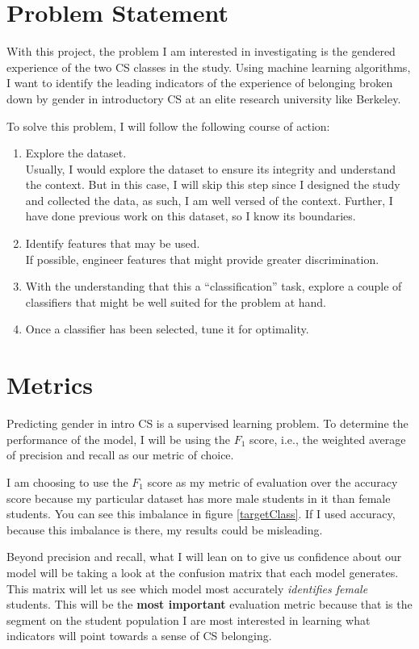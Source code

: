 \section*{Problem Statement}

With this project, the problem I am interested in investigating is the gendered experience of the two CS classes in the study. Using machine learning algorithms, I want to identify the leading indicators of the experience of belonging broken down by gender in introductory CS at an elite research university like Berkeley.

To solve this problem, I will follow the following course of action:
\begin{enumerate}%
\item Explore the dataset.\\
Usually, I would explore the dataset to ensure its integrity and understand the context. But in this case, I will skip this step since I designed the study and collected the data, as such, I am well versed of the context. Further, I have done previous work on this dataset, so I know its boundaries.
\item Identify features that may be used.\\ 
If possible, engineer features that might provide greater discrimination.
\item With the understanding that this a ``classification'' task, explore a couple of classifiers that might be well suited for the problem at hand.
\item Once a classifier has been selected, tune it for optimality.
\end{enumerate}

\section*{Metrics}


Predicting gender in intro CS is a supervised learning problem. To determine the performance of the model, I will be using the $F_1$ score, i.e., the weighted average of precision and recall as our metric of choice. 

I am choosing to use the $F_1$ score as my metric of evaluation over the accuracy score because my particular dataset has more male students in it than female students. You can see this imbalance in figure \ref{targetClass}. If I used accuracy, because this imbalance is there, my results could be misleading. 

Beyond precision and recall, what I will lean on to give us confidence about our model will be taking a look at the confusion matrix that each model generates. This matrix will let us see which model most accurately \emph{identifies female} students. This will be the \textbf{most important} evaluation metric because that is the segment on the student population I are most interested in learning what indicators will point towards a sense of CS belonging.

